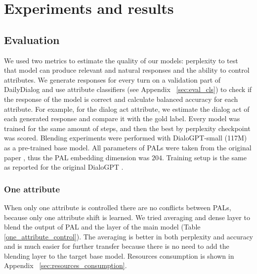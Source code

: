 \documentclass[11pt]{article}
\begin{document}
\section{Experiments and results}

\subsection{Evaluation}

We used two metrics to estimate the quality of our models:  perplexity to test that model can produce relevant and natural responses and the ability to control attributes. We generate responses for every turn on a validation part of DailyDialog and use attribute classifiers (see Appendix ~\ref{sec:eval_cls}) to check if the response of the model is correct and calculate balanced accuracy for each attribute. For example, for the dialog act attribute, we estimate the dialog act of each generated response and compare it with the gold label.
Every model was trained for the same amount of steps, and then the best by perplexity checkpoint was scored.
Blending experiments were performed with DialoGPT-small (117M) as a pre-trained base model. All parameters of PALs were taken from the original paper \cite{stickland2019bert}, thus the PAL embedding dimension was $204$. Training setup is the same as reported for the original DialoGPT \cite{zhang2020dialogpt}. 

\subsubsection{One attribute}

When only one attribute is controlled there are no conflicts between PALs, because only one attribute shift is learned. We tried averaging and dense layer to blend the output of PAL and the layer of the main model (Table \ref{one_attribute_control}). The averaging is better in both perplexity and accuracy and is much easier for further transfer because there is no need to add the blending layer to the target base model. Resources consumption is shown in Appendix ~\ref{sec:resources_consumption}.
\end{document}
